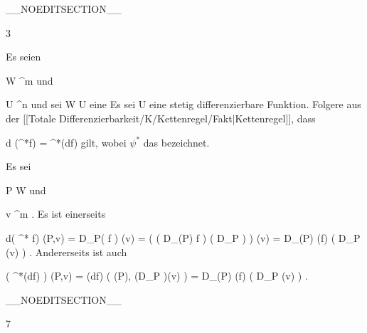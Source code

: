 __NOEDITSECTION__

{3}

{

Es seien

\mavergleichskette
{\vergleichskette
{ W
}
{ \subseteq }{ \R^m
}
{  }{
}
{    }{
}
{   }{
}
}
{}{}{}
und

\mavergleichskette
{\vergleichskette
{ U
}
{ \subseteq }{ \R^n
}
{  }{
}
{    }{
}
{   }{
}
}
{}{}{}
und sei
\maabbdisp {\psi} { W } { U
} {}
eine
Es sei
 { U } {\R
} {}
eine stetig differenzierbare Funktion. Folgere aus der
[[Totale Differenzierbarkeit/K/Kettenregel/Fakt|Kettenregel]],
dass

\mavergleichskettedisp
{\vergleichskette
{ d (\psi^*f)
}
{ =} { \psi^*(df)
}
{ } {
}
{ } {
}
{ } {
}
}
{}{}{}
gilt, wobei $\psi^*$ das
bezeichnet.

}
{

Es sei

\mavergleichskette
{\vergleichskette
{ P
}
{ \in }{  W
}
{  }{
}
{    }{
}
{   }{
}
}
{}{}{}
und

\mavergleichskette
{\vergleichskette
{ v
}
{ \in }{  \R^m
}
{  }{
}
{    }{
}
{   }{
}
}
{}{}{.}
Es ist einerseits

\mavergleichskettedisp
{\vergleichskette
{ d( \psi^* f) (P,v)
}
{ =} { D_P( f \circ \psi) (v)
}
{ =} { \left(  \left(  D_{\psi(P)} f  \right)  \circ \left(  D_P  \psi  \right)  \right) (v)
}
{ =} { D_{\psi(P)} (f) \left(  D_P \psi(v)  \right)
}
{ } {
}
}
{}{}{.}
Andererseits ist auch

\mavergleichskettedisp
{\vergleichskette
{ \left(  \psi^*(df)  \right) (P,v)
}
{ =} { (df) \left(  \psi(P), (D_P \psi )(v)  \right)
}
{ =} { D_{\psi(P)} (f) \left(  D_P \psi (v)  \right)
}
{ } {
}
{ } {
}
}
{}{}{.}

 }

__NOEDITSECTION__

{7}

